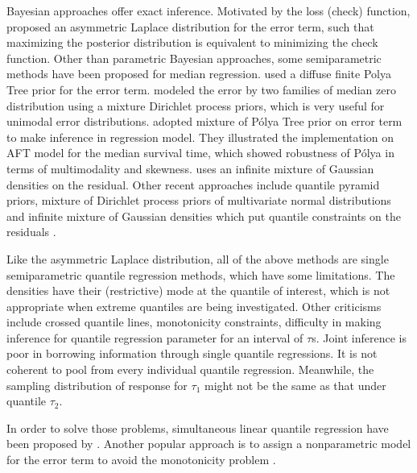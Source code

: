 \documentclass[12pt]{article}
\newcommand{\polya}{P\'{o}lya}
\begin{document}
Bayesian approaches offer exact inference. Motivated by the loss
(check) function, \citet{yu2001} proposed an asymmetric Laplace
distribution for the error term, such that maximizing the posterior
distribution is equivalent to minimizing the check function. Other
than parametric Bayesian approaches, some semiparametric methods have
been proposed for median regression. \citet{walker1999} used a diffuse
finite Polya Tree prior for the error term. \citet{kottas2001} modeled
the error by two families of median zero distribution using a mixture
Dirichlet process priors, which is very useful for unimodal error
distributions. \citet{hanson2002} adopted mixture of \polya{} Tree
prior on error term to make inference in regression model. They
illustrated the implementation on AFT model for the median survival
time, which showed robustness of \polya{} in terms of multimodality
and skewness.  \citet{reich2010} uses an infinite mixture of Gaussian
densities on the residual.  Other recent approaches include quantile
pyramid priors, mixture of Dirichlet process priors of multivariate
normal distributions and infinite mixture of Gaussian densities which
put quantile constraints on the residuals \citep{hjort2007,hjort2009,
  kottas2009}.

Like the asymmetric Laplace distribution, all of the above methods are
single semiparametric quantile regression methods, which have some
limitations. The densities have their (restrictive) mode at the
quantile of interest, which is not appropriate when extreme quantiles
are being investigated. Other criticisms include crossed quantile
lines, monotonicity constraints, difficulty in making inference for
quantile regression parameter for an interval of $\tau$s. Joint
inference is poor in borrowing information through single quantile
regressions. It is not coherent to pool from every individual quantile
regression. Meanwhile, the sampling distribution of response for
$\tau_1$ might not be the same as that under quantile $\tau_2$.

In order to solve those problems, simultaneous linear quantile
regression have been proposed by \citet{tokdar2011}.  Another popular
approach is to assign a nonparametric model for the error term to
avoid the monotonicity problem \citep{scaccia2003, geweke2007,
  taddy2010}.
\end{document}

